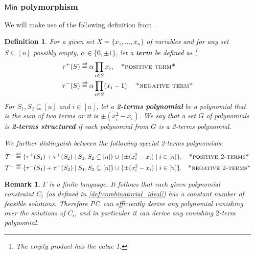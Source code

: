 \documentclass[11pt]{article}
\newcommand\mydef{\mathrel{\overset{\makebox[0pt]{\mbox{\normalfont\tiny\sffamily def}}}{=}}}
\newcommand{\PC}{\textsc{PC}}
\newcommand{\Min}{\textsf{Min}}
\newcommand{\1}{\textbf{1}}
\newcommand{\T}{\mathcal{T}}
\newtheorem{definition}[theorem]{Definition}
\newtheorem{remark}[theorem]{Remark}
\begin{document}
%

\subsubsection[Min polymorphism]{$\Min$ polymorphism}

We will make use of the following definition from \cite{Mastrolilli21TALG}.
\begin{definition}\label{def:2terms}
  For a given set $X=\{x_1,\ldots,x_n\}$ of variables and for any set $S\subseteq [n]$ possibly empty, $\alpha\in \{0, \pm 1\}$, let a \textbf{\emph{term}} be defined as \footnote{The empty product has the value 1.}
  \begin{align*}
    \tau^+(S)&\mydef \alpha\prod_{i\in S}x_i, \quad \textsc{*positive term*} \\
    \tau^-(S)&\mydef\alpha\prod_{i\in S}(x_i-1). \quad \textsc{*negative term*}
  \end{align*}
  For $S_1,S_2\subseteq [n]$ and $i\in [n]$, let a \textbf{\emph{2-terms polynomial}} be a polynomial that is the sum of two terms or it is $\pm(x_i^2-x_i)$.
  We say that a set $G$ of polynomials is \textbf{\emph{2-terms structured}} if each polynomial from $G$ is a 2-terms polynomial.

  We further distinguish between the following special 2-terms polynomials:
  \begin{align*}
    \T^+ & \mydef \{\tau^+(S_1)+\tau^+(S_2)\mid S_1,S_2\subseteq[n]\} \cup\{\pm(x_i^2-x_i)\mid i\in [n]\},  \quad \textsc{*positive 2-terms*}\\
    \T^- & \mydef \{\tau^-(S_1)+\tau^-(S_2)\mid S_1,S_2\subseteq[n]\} \cup\{\pm(x_i^2-x_i)\mid i\in [n]\}. \quad \textsc{*negative 2-terms*}
  \end{align*}
  \end{definition}

\begin{remark}
$\Gamma$ is a finite language. It follows that each given polynomial constraint $C_i$ (as defined in \cref{def:combinatorial_ideal}) has a constant number of feasible solutions.
Therefore \PC\ can efficiently derive any polynomial vanishing over the solutions of $C_i$, and in particular it can derive any vanishing $2$-term polynomial.
\end{remark}
\end{document}
